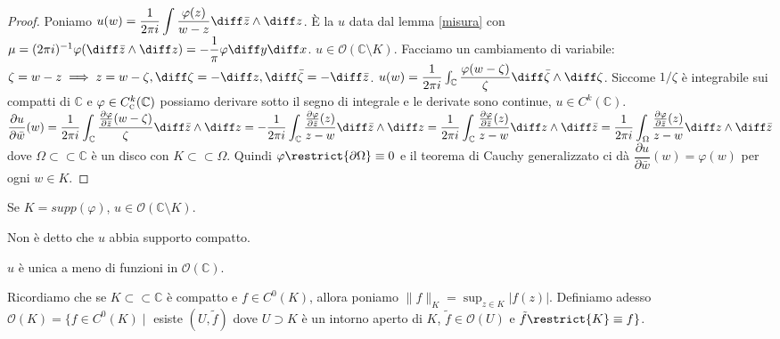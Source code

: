 \begin{proof}
  Poniamo $\displaystyle u(w)=\dfrac{1}{2\pi i}\int \dfrac{\varphi(z)}{w-z} \diff\bar{z}\wedge\diff z$. È la $u$ data dal lemma \ref{misura} con $\mu=(2\pi i)^{-1}\varphi(\diff\bar{z}\wedge\diff z)=-\dfrac{1}{\pi}\varphi\diff y\diff x$.
  $u \in \mathcal{O}(\mathbb{C}\setminus K)$. Facciamo un cambiamento di variabile: $\zeta=w-z \implies z=w-\zeta, \diff\zeta=-\diff z, \diff\bar{\zeta}=-\diff\bar{z}$.
  $u(w)=\dfrac{1}{2\pi i} \int_{\mathbb{C}} \dfrac{\varphi(w-\zeta)}{\zeta}\diff\bar{\zeta}\wedge\diff\zeta$. Siccome $1/\zeta$ è integrabile sui compatti di $\mathbb{C}$ e $\varphi \in C^k_{\text{\textsc{c}}}(\mathbb{C})$ possiamo derivare sotto il segno di integrale e le derivate sono continue, $u \in C^k(\mathbb{C})$.
  $\displaystyle \dfrac{\partial u}{\partial \bar{w}}(w)=\dfrac{1}{2\pi i}\int_{\mathbb{C}} \dfrac{\frac{\partial \varphi}{\partial \bar{z}}(w-\zeta)}{\zeta} \diff \bar{z}\wedge\diff z=-\dfrac{1}{2\pi i}\int_{\mathbb{C}} \dfrac{\frac{\partial\varphi}{\partial\bar{z}}(z)}{z-w}\diff\bar{z}\wedge\diff z=\dfrac{1}{2\pi i}\int_{\mathbb{C}} \dfrac{\frac{\partial\varphi}{\partial\bar{z}}(z)}{z-w}\diff z\wedge\diff\bar{z}=\dfrac{1}{2\pi i}\int_{\Omega} \dfrac{\frac{\partial\varphi}{\partial\bar{z}}(z)}{z-w}\diff z\wedge\diff\bar{z}$ dove $\Omega \subset \subset \mathbb{C}$ è un disco con $K \subset\subset \Omega$.
  Quindi $\varphi\restrict{\partial \Omega}\equiv 0$ e il teorema di Cauchy generalizzato ci dà $\dfrac{\partial u}{\partial\bar{w}}(w)=\varphi(w)$ per ogni $w \in K$.
\end{proof}

\begin{oss}
  Se $K=supp(\varphi)$, $u \in \mathcal{O}(\mathbb{C} \setminus K)$.
\end{oss}

\begin{oss}
  Non è detto che $u$ abbia supporto compatto.
\end{oss}

\begin{oss}
  $u$ è unica a meno di funzioni in $\mathcal{O}(\mathbb{C})$.
\end{oss}

\begin{defn}
  Ricordiamo che se $K \subset\subset \mathbb{C}$ è compatto e $f \in C^0(K)$, allora poniamo $\|f\|_K=\sup_{z \in K}|f(z)|$.
  Definiamo adesso $\mathcal{O}(K)=\{f \in C^0(K) \mid$ esiste $(U, \tilde{f})$ dove $U \supset K$ è un intorno aperto di $K$, $\tilde{f} \in \mathcal{O}(U)$ e $\tilde{f}\restrict{K}\equiv f\}$.
\end{defn}

